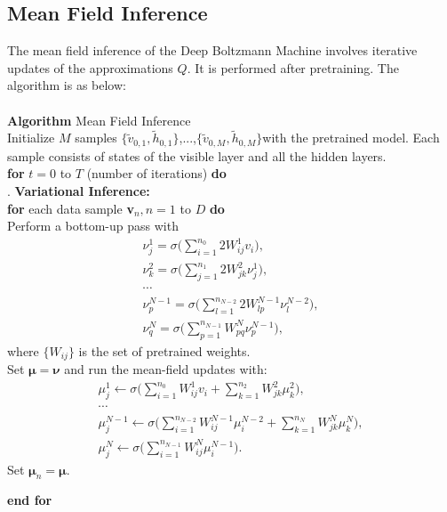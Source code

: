 \documentclass[12pt]{article}
\begin{document}
\subsection{Mean Field Inference}
The mean field inference of the Deep Boltzmann Machine involves iterative updates of the approximations $Q$. It is performed after pretraining. The algorithm is as below:\\
\\
\noindent \textbf{Algorithm} Mean Field Inference\\
Initialize $M$ samples $\{\tilde{v}_{0,1},\tilde{h}_{0,1}\}$,...,$\{\tilde{v}_{0,M},\tilde{h}_{0,M}\}$with the pretrained model. Each sample consists of states of the visible layer and all the hidden layers.\\
\noindent \textbf{for} $t = 0$ to $T$ (number of iterations) \textbf{do}\\
. \textbf{Variational Inference:}\\
\indent \textbf{for} each data sample \textbf{v}$_n,n=1$ to $D$ \textbf{do}\\
\indent\indent Perform a bottom-up pass with 
\begin{gather*}
\nu_j^1 = \sigma\Big( \sum_{i=1}^{n_0} 2W_{ij}^1v_i \Big),\\
\nu_k^2 = \sigma\Big( \sum_{j=1}^{n_1} 2W_{jk}^2\nu_j^1\Big),\\
\cdots\\
\nu_p^{N-1} = \sigma\Big( \sum_{l=1}^{n_{N-2}} 2W_{lp}^{N-1}\nu_l^{N-2} \Big),\\
\nu_q^{N} = \sigma\Big( \sum_{p=1}^{n_{N-1}} W_{pq}^{N}\nu_p^{N-1} \Big),
\end{gather*}
\indent\indent where $\{W_{ij}\}$ is the set of pretrained weights.\\
\indent\indent Set $\mathbold{\mu}=\mathbold{\nu}$ and run the mean-field updates with:
\begin{gather*}
\mu_j^1 \leftarrow \sigma\Big(\sum_{i=1}^{n_0} W_{ij}^1v_i + \sum_{k=1}^{n_2}W_{jk}^2\mu_k^2 \Big),\\
\cdots\\
\mu_j^{N-1} \leftarrow \sigma\Big(\sum_{i=1}^{n_{N-2}} W_{ij}^{N-1}\mu_i^{N-2} + \sum_{k=1}^{n_N}W_{jk}^N\mu_k^N \Big),\\
\mu_j^{N} \leftarrow \sigma\Big(\sum_{i=1}^{n_{N-1}} W_{ij}^{N}\mu_i^{N-1} \Big).
\end{gather*}
\indent\indent Set $\mathbold{\mu}_n = \mathbold{\mu}$. \par
\textbf{end for}\\
\end{document}
